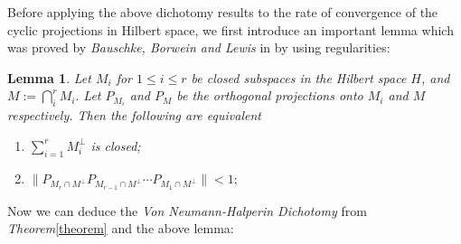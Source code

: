 \documentclass[11pt, a4paper]{amsart}
\newtheorem{lemma}[theorem]{Lemma}
\begin{document}
Before applying the above dichotomy results to the rate of convergence of the cyclic projections in Hilbert space, we first introduce an important lemma which was proved by \emph{Bauschke, Borwein and Lewis} in \cite{BL97} by using regularities:
\begin{lemma}\label{lemma}
Let $M_i$ for $1\leq i\leq r$ be closed subspaces in the Hilbert space $H$, and $M:=\bigcap_{i}^r M_i.$ Let $P_{M_i}$ and $P_{M}$ be the orthogonal projections onto $M_i$ and $M$ respectively. Then the following are equivalent 
\begin{enumerate}
\item $\sum_{i=1}^r M_{i}^{\perp}$ is closed;\\
\item $\|P_{M_r\cap M^{\perp}}P_{M_{r-1}\cap M^{\perp}}\cdots P_{M_1\cap M^{\perp}}\|<1;$\\
\end{enumerate}
\end{lemma}
Now we can deduce the \emph{Von Neumann-Halperin Dichotomy} from \emph{Theorem}\ref{theorem} and the above lemma:
\end{document}
